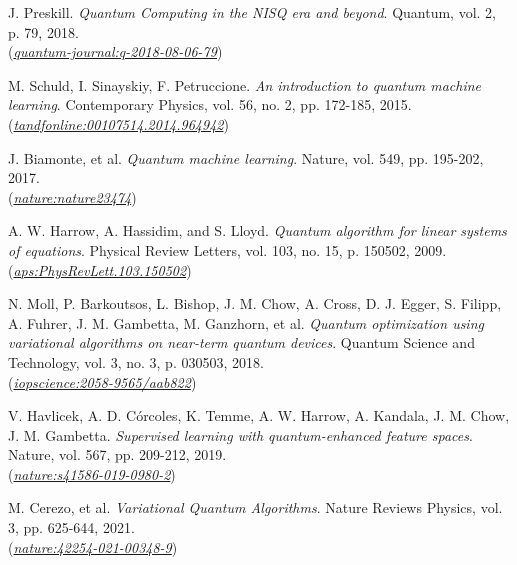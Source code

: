 \documentclass[a4paper]{report}
\begin{document}
\begin{thebibliography}{99}

    J. Preskill. \textit{Quantum Computing in the NISQ era and beyond}. Quantum, vol. 2, p. 79, 2018.\\
    (\href{https://quantum-journal.org/papers/q-2018-08-06-79/} {\textit{quantum-journal:q-2018-08-06-79}})

    M. Schuld, I. Sinayskiy, F. Petruccione. \textit{An introduction to quantum machine learning}. Contemporary Physics, vol. 56, no. 2, pp. 172-185, 2015.\\
    (\href{https://www.tandfonline.com/doi/abs/10.1080/00107514.2014.964942} {\textit{tandfonline:00107514.2014.964942}})

    J. Biamonte, et al. \textit{Quantum machine learning}. Nature, vol. 549, pp. 195-202, 2017.\\
    (\href{https://www.nature.com/articles/nature23474}{\textit{nature:nature23474}})

    A. W. Harrow, A. Hassidim, and S. Lloyd. \textit{Quantum algorithm for linear systems of equations}. Physical Review Letters, vol. 103, no. 15, p. 150502, 2009.\\
    (\href{https://journals.aps.org/prl/abstract/10.1103/PhysRevLett.103.150502} {\textit{aps:PhysRevLett.103.150502}})

    N. Moll, P. Barkoutsos, L. Bishop, J. M. Chow, A. Cross, D. J. Egger, S. Filipp, A. Fuhrer, J. M. Gambetta, M. Ganzhorn, et al. \textit{Quantum optimization using variational algorithms on near-term quantum devices}. Quantum Science and Technology, vol. 3, no. 3, p. 030503, 2018.\\
    (\href{https://iopscience.iop.org/article/10.1088/2058-9565/aab822} {\textit{iopscience:2058-9565/aab822}})
    
    V. Havlicek, A. D. Córcoles, K. Temme, A. W. Harrow, A. Kandala, J. M. Chow, J. M. Gambetta. \textit{Supervised learning with quantum-enhanced feature spaces}. Nature, vol. 567, pp. 209-212, 2019.\\
    (\href{https://www.nature.com/articles/s41586-019-0980-2}
    {\textit{nature:s41586-019-0980-2}})
        
    M. Cerezo, et al. \textit{Variational Quantum Algorithms}. Nature Reviews Physics, vol. 3, pp. 625-644, 2021.\\
    (\href{https://www.nature.com/articles/s42254-021-00348-9}{\textit{nature:42254-021-00348-9}})


\end{thebibliography}
\end{document}
